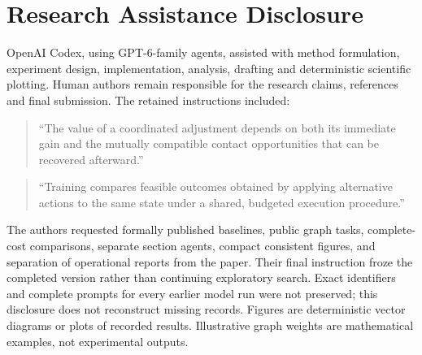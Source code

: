 \section{Research Assistance Disclosure}
OpenAI Codex, using GPT-6-family agents, assisted with method formulation,
experiment design, implementation, analysis, drafting and deterministic
scientific plotting. Human authors remain responsible for the research claims,
references and final submission. The retained instructions included:
\begin{quote}
``The value of a coordinated adjustment depends on both its immediate gain
and the mutually compatible contact opportunities that can be recovered
afterward.''
\end{quote}
\begin{quote}
``Training compares feasible outcomes obtained by applying alternative actions
to the same state under a shared, budgeted execution procedure.''
\end{quote}
The authors requested formally published baselines, public graph tasks,
complete-cost comparisons, separate section agents, compact consistent
figures, and separation of operational reports from the paper. Their final
instruction froze the completed version rather than continuing exploratory
search. Exact identifiers and complete prompts for every earlier model run
were not preserved; this disclosure does not reconstruct missing records.
Figures are deterministic vector diagrams or plots of recorded results.
Illustrative graph weights are mathematical examples, not experimental outputs.

